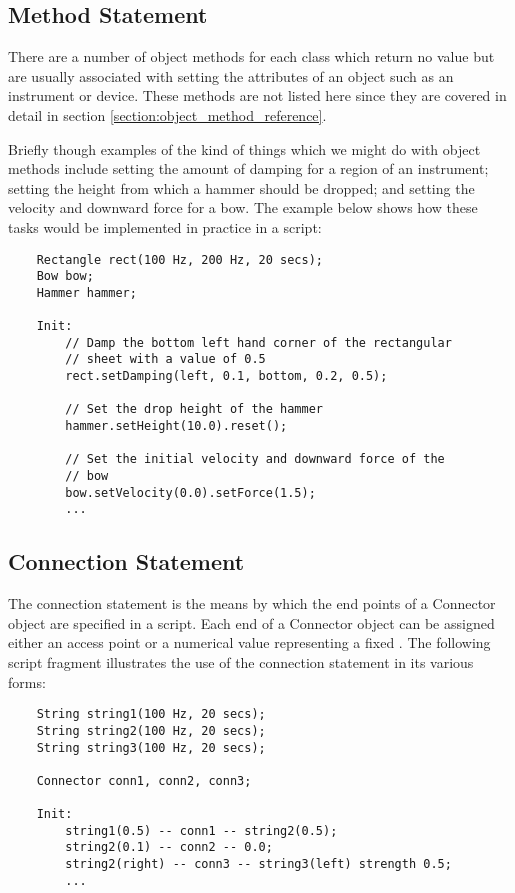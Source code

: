\subsection{Method Statement}
\label{section:method_statement}
There are a number of object methods for each class which return
no value but are usually associated with setting the attributes of
an object such as an instrument or device. These methods are not
listed here since they are covered in detail in section
\ref{section:object_method_reference}.

Briefly though examples of the kind of things which we might do with
object methods include setting the amount of damping for a region of
an instrument; setting the height from which a hammer should be
dropped; and setting the velocity and downward force for a bow.
The example below shows how these tasks would be implemented in
practice in a script:

\begin{verbatim}
    Rectangle rect(100 Hz, 200 Hz, 20 secs);
    Bow bow;
    Hammer hammer;
    
    Init:
        // Damp the bottom left hand corner of the rectangular
        // sheet with a value of 0.5
        rect.setDamping(left, 0.1, bottom, 0.2, 0.5);

        // Set the drop height of the hammer
        hammer.setHeight(10.0).reset();

        // Set the initial velocity and downward force of the
        // bow
        bow.setVelocity(0.0).setForce(1.5);
        ...
\end{verbatim}

\subsection{Connection Statement}
\label{section:connection_statement}
The connection statement is the means by which the end points of a
Connector object are specified in a script. Each end of a 
Connector object can be assigned either an access point or 
a numerical value representing a fixed . The following
script fragment illustrates the use of the connection statement in its
various forms:

\begin{verbatim}
    String string1(100 Hz, 20 secs);
    String string2(100 Hz, 20 secs);
    String string3(100 Hz, 20 secs);
    
    Connector conn1, conn2, conn3;
    
    Init:
        string1(0.5) -- conn1 -- string2(0.5);
        string2(0.1) -- conn2 -- 0.0;
        string2(right) -- conn3 -- string3(left) strength 0.5;
        ...
\end{verbatim}

